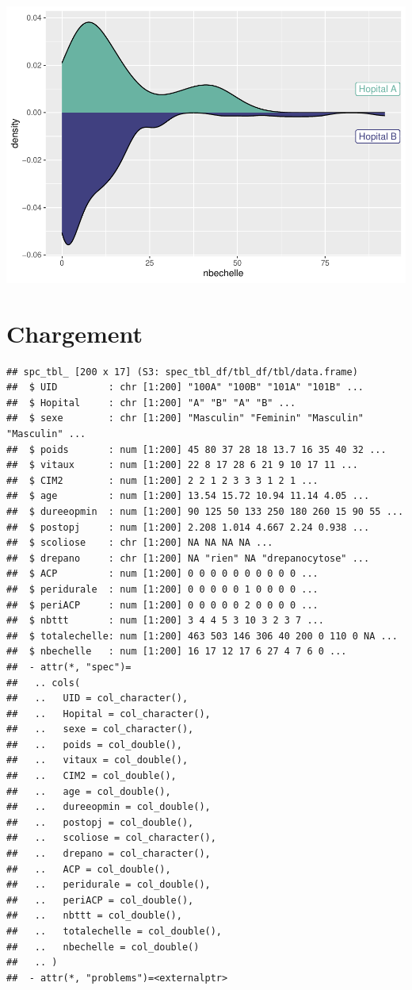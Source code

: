 \documentclass[
]{book}
\begin{document}
\includegraphics{_main_files/figure-latex/unnamed-chunk-80-1.pdf}

\hypertarget{chargement}{%
\section{Chargement}\label{chargement}}

\begin{verbatim}
## spc_tbl_ [200 x 17] (S3: spec_tbl_df/tbl_df/tbl/data.frame)
##  $ UID         : chr [1:200] "100A" "100B" "101A" "101B" ...
##  $ Hopital     : chr [1:200] "A" "B" "A" "B" ...
##  $ sexe        : chr [1:200] "Masculin" "Feminin" "Masculin" "Masculin" ...
##  $ poids       : num [1:200] 45 80 37 28 18 13.7 16 35 40 32 ...
##  $ vitaux      : num [1:200] 22 8 17 28 6 21 9 10 17 11 ...
##  $ CIM2        : num [1:200] 2 2 1 2 3 3 3 1 2 1 ...
##  $ age         : num [1:200] 13.54 15.72 10.94 11.14 4.05 ...
##  $ dureeopmin  : num [1:200] 90 125 50 133 250 180 260 15 90 55 ...
##  $ postopj     : num [1:200] 2.208 1.014 4.667 2.24 0.938 ...
##  $ scoliose    : chr [1:200] NA NA NA NA ...
##  $ drepano     : chr [1:200] NA "rien" NA "drepanocytose" ...
##  $ ACP         : num [1:200] 0 0 0 0 0 0 0 0 0 0 ...
##  $ peridurale  : num [1:200] 0 0 0 0 0 1 0 0 0 0 ...
##  $ periACP     : num [1:200] 0 0 0 0 0 2 0 0 0 0 ...
##  $ nbttt       : num [1:200] 3 4 4 5 3 10 3 2 3 7 ...
##  $ totalechelle: num [1:200] 463 503 146 306 40 200 0 110 0 NA ...
##  $ nbechelle   : num [1:200] 16 17 12 17 6 27 4 7 6 0 ...
##  - attr(*, "spec")=
##   .. cols(
##   ..   UID = col_character(),
##   ..   Hopital = col_character(),
##   ..   sexe = col_character(),
##   ..   poids = col_double(),
##   ..   vitaux = col_double(),
##   ..   CIM2 = col_double(),
##   ..   age = col_double(),
##   ..   dureeopmin = col_double(),
##   ..   postopj = col_double(),
##   ..   scoliose = col_character(),
##   ..   drepano = col_character(),
##   ..   ACP = col_double(),
##   ..   peridurale = col_double(),
##   ..   periACP = col_double(),
##   ..   nbttt = col_double(),
##   ..   totalechelle = col_double(),
##   ..   nbechelle = col_double()
##   .. )
##  - attr(*, "problems")=<externalptr>
\end{verbatim}
\end{document}
